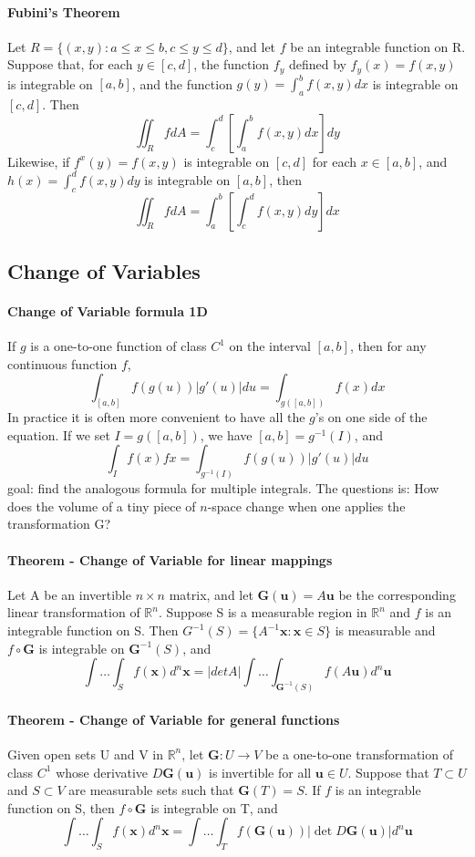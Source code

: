 \documentclass[11pt]{article}
\newcommand{\tb}[1]{\textbf{#1}}
\newcommand{\real}[0]{\mathbb{R}}
\newcommand{\func}[3]{\tb{#1}: {#2} \rightarrow {#3} }
\newcommand{\vx}[0]{\tb{x}}
\begin{document}
\paragraph{Fubini's Theorem} Let $R = \{(x,y): a\leq x\leq b, c \leq y \leq d \}$, and let $f$ be an integrable function on R. Suppose that, for each $y \in [c, d]$, the function $f_y$ defined by $f_y(x) = f(x, y)$ is integrable on $[a,b]$, and the function $g(y) = \int_a^bf(x,y)dx$ is integrable on $[c,d]$. Then
$$\iint_R fdA = \int_c^d\left[\int_a^b f(x,y)dx\right]dy$$
Likewise, if $f^x(y) = f(x,y)$ is integrable on $[c,d]$ for each $x \in [a,b]$, and $h(x) = \int_c^df(x,y)dy$ is integrable on $[a,b]$, then
$$\iint_R fdA = \int_a^b\left[\int_c^d f(x,y)dy\right]dx$$

\subsection{Change of Variables}
\paragraph{Change of Variable formula 1D} If $g$ is a one-to-one function of class $C^1$ on the interval $[a, b]$, then for any continuous function $f$,
$$\int_{[a,b]} f(g(u))|g'(u)|du = \int_{g([a,b])}f(x)dx$$
In practice it is often more convenient to have all the $g$'s on one side of the equation. If we set $I = g([a, b])$, we have $[a, b] = g^{-1}(I)$, and
$$\int_I f(x) fx = \int_{g^{-1}(I)}f(g(u))|g'(u)|du$$
goal: find the analogous formula for multiple integrals. The questions is: How does the volume of a tiny piece of $n$-space change when one applies the transformation G?
\paragraph{Theorem - Change of Variable for linear mappings} Let A be an invertible $n \times n$ matrix, and let $\tb{G}(\tb{u}) = A\tb{u}$ be the corresponding linear transformation of $\real^n$. Suppose S is a measurable region in $\real^n$ and $f$ is an integrable function on S. Then $G^{-1}(S) = \{A^{-1}\tb{x}: \tb{x} \in S\}$ is measurable and $f \circ \tb{G}$ is integrable on $\tb{G}^{-1}(S)$, and
    $$ \int \hdots \int_S f(\vx)d^n\vx = |det A| \int \hdots \int_{\tb{G}^{-1}(S)}f(A\tb{u})d^n\tb{u}$$

\paragraph{Theorem - Change of Variable for general functions} Given open sets U and V in $\real^n$, let $\func{G}{U}{V}$ be a one-to-one transformation of class $C^1$ whose derivative $D\tb{G}(\tb{u})$ is invertible for all $\tb{u} \in U$. Suppose that $T \subset U$ and $S \subset V$ are measurable sets such that $\tb{G}(T) = S$. If $f$ is an integrable function on S, then $f \circ \tb{G}$ is integrable on T, and 
    $$ \int \hdots \int_S f(\vx)d^n\vx = \int \hdots \int_{T}f(\tb{G}(\tb{u}))|\det D\tb{G}(\tb{u})|d^n\tb{u}$$
    
\end{document}

